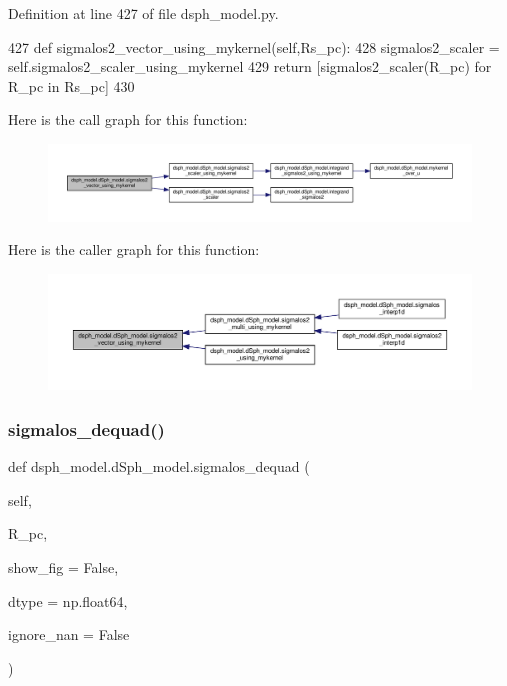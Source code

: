 Definition at line 427 of file dsph\+\_\+model.\+py.


\begin{DoxyCode}
427     \textcolor{keyword}{def }sigmalos2\_vector\_using\_mykernel(self,Rs\_pc):
428         sigmalos2\_scaler = self.sigmalos2\_scaler\_using\_mykernel
429         \textcolor{keywordflow}{return} [sigmalos2\_scaler(R\_pc) \textcolor{keywordflow}{for} R\_pc \textcolor{keywordflow}{in} Rs\_pc]
430     
\end{DoxyCode}
Here is the call graph for this function\+:
\nopagebreak
\begin{figure}[H]
\begin{center}
\leavevmode
\includegraphics[width=350pt]{d0/d25/classdsph__model_1_1dSph__model_a00cd796cf178fe8b3435e941976e8f27_cgraph}
\end{center}
\end{figure}
Here is the caller graph for this function\+:
\nopagebreak
\begin{figure}[H]
\begin{center}
\leavevmode
\includegraphics[width=350pt]{d0/d25/classdsph__model_1_1dSph__model_a00cd796cf178fe8b3435e941976e8f27_icgraph}
\end{center}
\end{figure}
\mbox{\label{classdsph__model_1_1dSph__model_a5b73e854e8ac1b1c6a467498cd181e7a}} 
\subsubsection{\texorpdfstring{sigmalos\+\_\+dequad()}{sigmalos\_dequad()}}
{\footnotesize\ttfamily def dsph\+\_\+model.\+d\+Sph\+\_\+model.\+sigmalos\+\_\+dequad (\begin{DoxyParamCaption}\item[{}]{self,  }\item[{}]{R\+\_\+pc,  }\item[{}]{show\+\_\+fig = {\ttfamily False},  }\item[{}]{dtype = {\ttfamily np.float64},  }\item[{}]{ignore\+\_\+nan = {\ttfamily False} }\end{DoxyParamCaption})}



